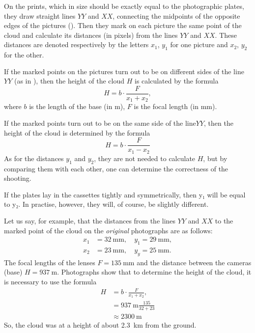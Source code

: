 On the prints, which in size should be exactly equal to the photographic plates, they draw straight lines $YY$ and $XX$, connecting the midpoints of the opposite edges of the pictures (). Then they mark on each picture the same point of the cloud and calculate its distances (in pixels) from the lines $YY$ and $XX$. These distances are denoted respectively by the letters $x_{1}$, $y_{1}$ for one picture and $x_{2}$, $y_{2}$ for the other.

If the marked points on the pictures turn out to be on different sides of the line $YY$ (as in ), then the height of the cloud $H$ is calculated by the formula
\begin{equation*}%
H = b \cdot \frac{F}{x_{1} + x_{2}},
\end{equation*}	
where $b$ is the length of the base (in \si{\meter}), $F$ is the focal length (in \si{\milli\meter}).

If the marked points turn out to be on the same side of the line$YY$, then the height of the cloud is determined by the formula
\begin{equation*}%
H = b \cdot \frac{F}{x_{1} - x_{2}}
\end{equation*}	
As for the distances $y_{1}$ and $y_{2}$, they are not needed to calculate $H$, but by comparing them with each other, one can determine the correctness of the shooting.

If the plates lay in the cassettes tightly and symmetrically, then y₁ will be equal to y₂. In practise, however, they will, of course, be slightly different.

Let us say, for example, that the distances from the lines $YY$ and $XX$ to the marked point of the cloud on the \emph{original} photographs are as follows:
\begin{align*}%
x_{1} & = \SI{32}{\milli\meter},\quad  y_{1} = \SI{29}{\milli\meter},\\
x_{2} & = \SI{23}{\milli\meter},\quad  y_{y} = \SI{25}{\milli\meter}.
\end{align*}
The focal lengths of the lenses $F = \SI{135}{\milli\meter}$ and the distance between the cameras (base) $H = \SI{937}{\meter}$. Photographs show that to determine the height of the cloud, it is necessary to use the formula
\begin{align*}%
H & = b \cdot \frac{F}{x_{1} + x_{2}},\\
& =  \SI{937}{\meter} \frac{135}{32 + 23}\\
& \approx \SI{2300}{\meter}
\end{align*}	
So, the cloud was at a height of about \SI{2.3}{\kilo\meter} from the ground.

